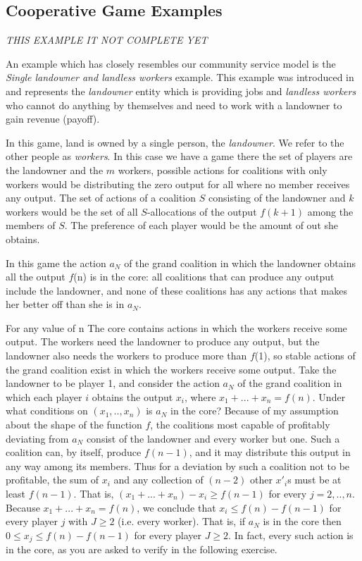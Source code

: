         \subsection{Cooperative Game Examples}\label{sec:CWSDefinition}

        \emph {THIS EXAMPLE IT NOT COMPLETE YET}

        An example which has closely resembles our community service model is the \emph{Single landowner and landless workers} example.
        This example was introduced in \cite{GVK369342747} and represents the \emph{landowner} entity which is providing jobs and \emph{landless workers} who cannot do anything by themselves and need to work with a landowner to gain revenue (payoff).

        In this game, land is owned by a single person, the \emph{landowner}. We refer to the other people as \emph{workers}. In this case we have a game there the set of players are the landowner and the $m$ workers, possible actions for coalitions with only workers would be distributing the zero output for all where no member receives any output. The set of actions of a coalition $S$ consisting of the landowner and $k$ workers would be the set of all $S$-allocations of the output $f(k+1)$ among the members of $S$. The preference of each player would be the amount of out she obtains.

        In this game the action $a_{N}$ of the grand coalition in which the landowner obtains all the output $f$(n)
        is in the core: all coalitions that can produce any output include the landowner, and none of these
        coalitions has any actions that makes her better off than she is in $a_{N}$.

        For any value of n The core contains actions in which the workers receive some output.
        The workers need the landowner to produce any output, but the landowner
        also needs the workers to produce more than $f$(1), so stable actions of the grand coalition exist in which the
        workers receive some output. Take the landowner to be player 1, and consider the action $a_{N}$ of the grand
        coalition in which each player $i$ obtains the output $x_{i}$, where $x_{1}+...+x_{n}=f(n)$. Under what conditions
        on  $(x_{1},..,x_{n})$ is $a_{N}$ in the core? Because of my assumption about the shape of the function $f$, the
        coalitions most capable of profitably deviating from $a_{N}$ consist of the landowner and every worker but one.
         Such a coalition can, by itself, produce $f(n-1)$, and it may distribute this output in any way among its members.
         Thus for a deviation by such a coalition not to be profitable, the sum of $x_{i}$ and any collection of $(n-2)$ other
          $x'_{i}$s must be at least $f(n-1)$. That is, $(x_{1}+...+x_{n})-x_{i}\geq f(n-1)$ for every $j=2,..,n$. Because
          $x_{1}+...+x_{n}=f(n)$, we conclude that $x_{i}\leq f(n)-f(n-1)$ for every player $j$ with $J\geq 2$ (i.e. every worker).
          That is, if $a_{N}$ is in the core then $0\leq x_{j}\leq f(n)-f(n-1)$ for every player $J\geq 2$. In fact, every such action
          is in the core, as you are asked to verify in the following exercise.

